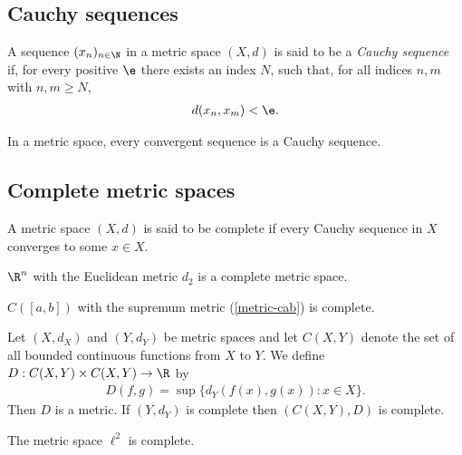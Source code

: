 \documentclass{article}
\begin{document}
\subsection{Cauchy sequences}

\begin{definition}
	A sequence $(x_n)_{n\in\N}$ in a metric space $(X,d)$ is said to be a \emph{Cauchy sequence}
	if, for every positive $\e$ there exists an index $N$, such that, for all indices $n,m$ with
	$n,m\geq N$,
	\begin{align*}
		d(x_n,x_m)<\e.
	\end{align*}
\end{definition}

\begin{proposition}[7.2]
	In a metric space, every convergent sequence is a Cauchy sequence.
\end{proposition}

\subsection{Complete metric spaces}

\begin{definition}
	A metric space $(X,d)$ is said to be complete if every Cauchy sequence in $X$ converges to some
	$x\in X$.
\end{definition}

\begin{proposition}[7.5]
	$\R^n$ with the Euclidean metric $d_2$ is a complete metric space.
\end{proposition}

\begin{proposition}[7.6]
	$C([a,b])$ with the supremum metric (\vref{metric-cab}) is complete.
\end{proposition}

\begin{proposition}[7.7]
	Let $(X,d_X)$ and $(Y,d_Y)$ be metric spaces and let $C(X,Y)$ denote the set of all
	bounded continuous functions from $X$ to $Y$. We define $D:C(X,Y)\times C(X,Y)\to\R$
	by
	\begin{align*}
		D(f,g)=\sup\{d_Y(f(x),g(x)):x\in X\}.
	\end{align*}
	Then $D$ is a metric. If $(Y,d_Y)$ is complete then $(C(X,Y),D)$ is complete.
\end{proposition}

\begin{proposition}[7.8]
	The metric space $\ell^2$ is complete.
\end{proposition}
\end{document}
